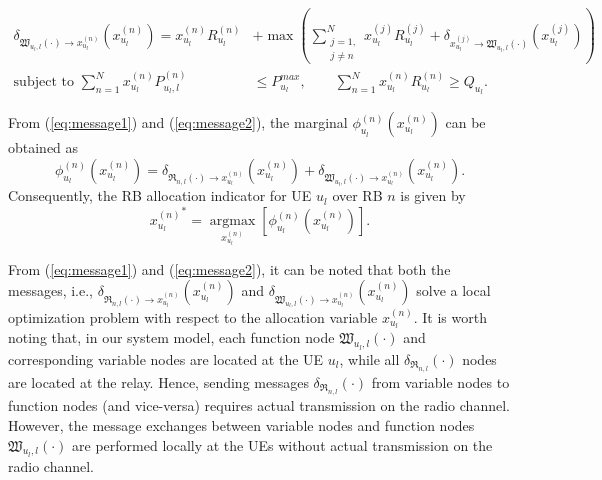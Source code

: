 \documentclass[twocolumn,10pt]{IEEEtran}
\begin{document}
\begin{figure*}[!t]
\normalsize

\begin{align} \label{eq:message2}
\delta_{\mathfrak{W}_{u_l, l}(\cdot)  \rightarrow x_{u_l}^{(n)}} \left( x_{u_l}^{(n)} \right) =  x_{u_l}^{(n)} R_{u_l}^{(n)}   &+    
\max \left( \sum_{\substack{j =1, \\ j \neq n}}^N   x_{u_l}^{(j)} R_{u_l}^{(j)}  + \delta_{x_{u_l}^{(j)} \rightarrow \mathfrak{W}_{u_l, l}(\cdot)   } \left( x_{u_l}^{(j)} \right) \right) \nonumber \\
\text{subject to } \displaystyle \sum_{n =1}^N x_{u_l}^{(n)} P_{u_l, l}^{(n)} & \leq  P_{u_l}^{max}, \quad \quad
    \sum_{n =1}^N    x_{u_l}^{(n)} R_{u_l}^{(n)}   \geq  Q_{u_l}.
\end{align}


\hrulefill
\vspace*{4pt}
\end{figure*}


From (\ref{eq:message1}) and (\ref{eq:message2}), the marginal  $\phi_{u_l}^{(n)}\left( x_{u_l}^{(n)} \right)$ can be obtained as
\begin{equation}
\phi_{u_l}^{(n)}\left( x_{u_l}^{(n)} \right) = \delta_{\mathfrak{R}_{n,l}(\cdot) \rightarrow x_{u_l}^{(n)}} \left( x_{u_l}^{(n)} \right) + \delta_{\mathfrak{W}_{u_l, l}(\cdot)  \rightarrow x_{u_l}^{(n)}} \left( x_{u_l}^{(n)} \right).
\end{equation}
Consequently, the RB allocation indicator for UE $u_l$ over RB $n$ is given by
\begin{equation} \label{eq:x_opt}
{x_{u_l}^{(n)}}^* =  \underset{ x_{u_l}^{(n)} }{\operatorname{argmax}}  \left[ \phi_{u_l}^{(n)}\left( x_{u_l}^{(n)} \right) \right]. 
\end{equation}

From (\ref{eq:message1}) and (\ref{eq:message2}),  it can be noted that both the messages, i.e., $\delta_{\mathfrak{R}_{n,l}(\cdot) \rightarrow x_{u_l}^{(n)}} \left( x_{u_l}^{(n)} \right)$ and $\delta_{\mathfrak{W}_{u_l, l}(\cdot)  \rightarrow x_{u_l}^{(n)}} \left( x_{u_l}^{(n)} \right)$ solve a local optimization problem with respect to the allocation variable $ x_{u_l}^{(n)}$. It is worth noting that, in our system model,  each  function node $\mathfrak{W}_{u_l, l}(\cdot)$ and corresponding variable nodes are located at the UE $u_l$, while all $\delta_{\mathfrak{R}_{n,l}}(\cdot) $ nodes are located at the relay. Hence, sending messages $\delta_{\mathfrak{R}_{n,l}}(\cdot) $ from variable nodes to  function nodes (and vice-versa) requires actual transmission on the radio channel. However, the message exchanges between variable nodes and  function nodes $\mathfrak{W}_{u_l, l}(\cdot)$ are performed locally at the UEs without actual transmission on the radio channel.
\end{document}
